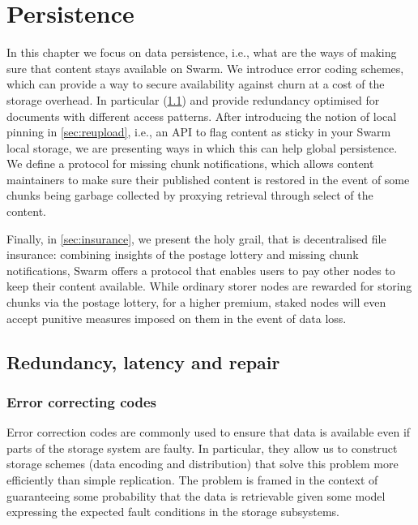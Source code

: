 \chapter{Persistence \statusgreen}\label{sec:persistence}


In this chapter we focus on data persistence, i.e., what are the ways of making sure that content stays available on Swarm. 
We introduce error coding schemes, which can provide a way to secure availability against churn at a cost of the storage overhead. 
In particular  (\ref{sec:repair}) and   %
provide redundancy optimised for documents with different access patterns.
After introducing the notion of local pinning in \ref{sec:reupload}, i.e., an API to flag content as sticky in your Swarm local storage, we are presenting ways in which this can help global persistence. We define a protocol for missing chunk notifications, which allows content maintainers to make sure their published content is restored in the event of some chunks being garbage collected by proxying retrieval through select  of the content.

Finally, in \ref{sec:insurance}, we present the holy grail, that is decentralised file insurance: combining insights of the postage lottery and missing chunk notifications, Swarm offers a protocol that enables users to pay other nodes to keep their content available. While ordinary storer nodes are rewarded for storing chunks via the postage lottery, for a higher premium, staked nodes will even accept punitive measures imposed on them in the event of data loss.


\section{Redundancy, latency and repair \statusgreen}\label{sec:repair}

\green{}

\subsection{Error correcting codes \statusgreen}\label{sec:error-correcting-codes}

Error correction codes are commonly used to ensure that data is available even if parts of the storage system are faulty. In particular, they allow us to construct storage schemes (data encoding and distribution) that solve this problem more efficiently than simple replication. The problem is framed in the context of guaranteeing some probability that the data is retrievable given some model expressing the expected fault conditions in the storage subsystems.

